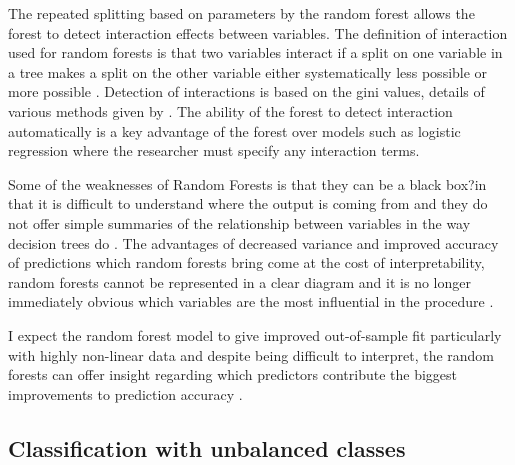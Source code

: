 \documentclass[11pt,a4paper]{article}
\begin{document}
The repeated splitting based on parameters by the random forest allows the forest to detect interaction effects between variables. The definition of interaction used for random forests is that two variables interact if a split on one variable in a tree makes a split on the other variable either systematically less possible or more possible \citep{breiman01}. Detection of interactions is based on the gini values,  details of various methods given by \citet{kelly12}. The ability of the forest to detect interaction automatically is a key advantage of the forest over models such as logistic regression where the researcher must specify any interaction terms.

Some of the weaknesses of Random Forests is that they can be a black box?in that it is difficult to understand where the output is coming from and they do not offer simple summaries of the relationship between variables in the way decision trees do \citep{varian14}. The advantages of decreased variance and improved accuracy of predictions which random forests bring come at the cost of interpretability, random forests cannot be represented in a clear diagram and it is no longer immediately obvious which variables are the most influential in the procedure \citep{james13}.

I expect the random forest model to give improved out-of-sample fit particularly with highly non-linear data and despite being difficult to interpret, the random forests can offer insight regarding which predictors contribute the biggest improvements to prediction accuracy \citep{varian14}.


\subsection{Classification with unbalanced classes}
\end{document}
